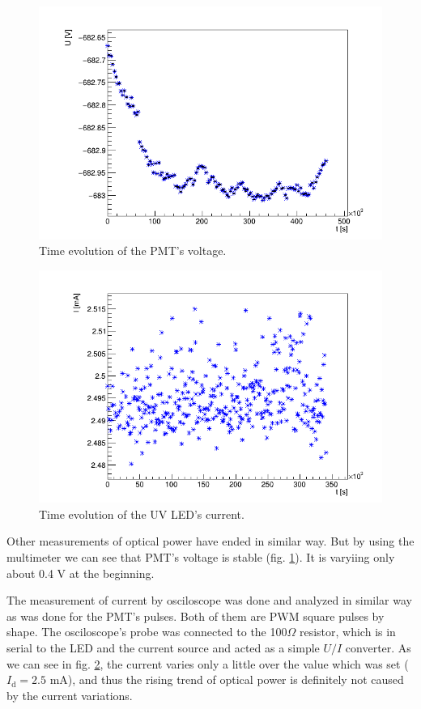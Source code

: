 \begin{figure}[H]
 \centering
 \includegraphics[scale=0.5]{./pictures/voltage}
 \caption{Time evolution of the PMT's voltage.}
 \label{PMTVolt}
\end{figure}

\begin{figure}[H]
 \centering
 \includegraphics[scale=0.5]{./pictures/Current}
 \caption{Time evolution of the UV LED's current.}
 \label{LEDCurrent}
\end{figure}

Other measurements of optical power have ended in similar way. But by using the multimeter we can see that PMT's voltage is stable (fig. \ref{PMTVolt}). It is varyiing only about 0.4 V at the beginning.
\par
The measurement of current by osciloscope was done and analyzed in similar way as was done for the PMT's pulses. Both of them are PWM square pulses by shape. The osciloscope's probe was connected to the 100$\Omega$ resistor, which is in serial to the LED and the current source and acted as a simple $U/I$ converter. As we can see in fig. \ref{LEDCurrent}, the current varies only a little over the value which was set ($I_\textrm{d} = 2.5$ mA), and thus the rising trend of optical power is definitely not caused by the current variations.


